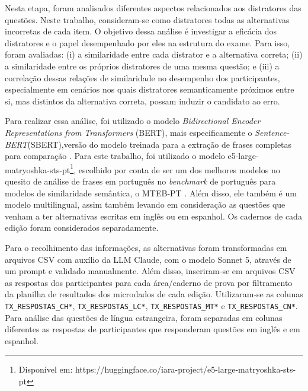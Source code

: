 \documentclass[a4paper,10pt, twocolumn]{article}
\begin{document}

Nesta etapa, foram analisados diferentes aspectos relacionados aos distratores das questões. Neste trabalho, consideram-se como distratores todas as alternativas incorretas de cada item. O objetivo dessa análise é investigar a eficácia dos distratores e o papel desempenhado por eles na estrutura do exame. Para isso, foram avaliadas: (i) a similaridade entre cada distrator e a alternativa correta; (ii) a similaridade entre os próprios distratores de uma mesma questão; e (iii) a correlação dessas relações de similaridade no desempenho dos participantes, especialmente em cenários nos quais distratores semanticamente próximos entre si, mas distintos da alternativa correta, possam induzir o candidato ao erro.

Para realizar essa análise, foi utilizado o modelo \textit{Bidirectional Encoder Representations from Transformers} (BERT), mais especificamente o \textit{Sentence-BERT}(SBERT),versão do modelo treinada para a extração de frases completas para comparação \cite{reimers_sentence-bert_2019}. Para este trabalho, foi utilizado o modelo e5-large-matryoshka-sts-pt\footnote{Disponível em: https://huggingface.co/iara-project/e5-large-matryoshka-sts-pt}, escolhido por conta de ser um dos melhores modelos no quesito de análise de frases em português no \textit{benchmark} de português para modelos de similaridade semântica, o MTEB-PT \cite{okamura_beyond_2026}. Além disso, ele também é um modelo multilingual, assim também levando em consideração as questões que venham a ter alternativas escritas em inglês ou em espanhol. Os cadernos de cada edição foram considerados separadamente.

Para o recolhimento das informações, as alternativas foram transformadas em arquivos CSV com auxílio da LLM Claude, com o modelo Sonnet 5, através de um prompt e validado manualmente. Além disso, inseriram-se em arquivos CSV as respostas dos participantes para cada área/caderno de prova por filtramento da planilha de resultados dos microdados de cada edição. Utilizaram-se as colunas \texttt{TX\_RESPOSTAS\_CH*}, \texttt{TX\_RESPOSTAS\_LC*}, \texttt{TX\_RESPOSTAS\_MT*} e \texttt{TX\_RESPOSTAS\_CN*}. Para análise das questões de língua estrangeira, foram separadas em colunas diferentes as respostas de participantes que responderam questões em inglês e em espanhol.
\end{document}
